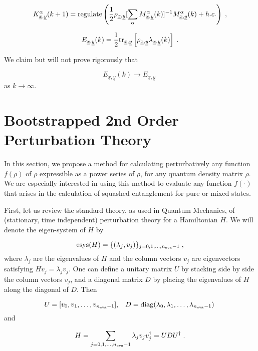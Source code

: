 \documentclass[12pt]{article}%
\newcommand{\tr}[0]{{\rm tr }}
\newcommand{\beq}{\begin{equation}}
\newcommand{\eeq}{\end{equation}}
\newcommand{\ul}[1]{\underline{#1}}
\newcommand{\rvx}[0]{{\ul{x}}}
\newcommand{\rvy}[0]{{\ul{y}}}
\newcommand{\lam}[0]{\lambda}
\newcommand{\nev}[0]{{n_{\rm eva}}}
\newcommand{\alp}[0]{{\alpha}}
\begin{document}
\beq
K^{\alp}_{\rvx,\rvy}(k+1)
=
{\rm regulate}\left(\frac{1}{2}\rho_{\rvx, \rvy}[\sum_\alp M^\alp_{\rvx, \rvy}(k)]^{-1}
M^\alp_{\rvx, \rvy}(k) + h.c.\right)
\;,
\eeq

\beq
E_{\rvx, \rvy}(k) = \frac{1}{2}\tr_{\rvx, \rvy} \left[\rho_{\rvx, \rvy}\lam_{\rvx, \rvy}(k)\right]
\;.
\eeq


We claim but will not prove rigorously that

\beq
E_{\rvx, \rvy}(k)\rightarrow
E_{\rvx, \rvy}
\;
\eeq
as $k\rightarrow \infty$.




























\section{Bootstrapped 2nd Order Perturbation Theory}

In this section, we
propose a method for calculating perturbatively
any function $f(\rho)$ of $\rho$
 expressible
as a power series of $\rho$, for any quantum density
matrix $\rho$. We are especially interested
in using this method
to evaluate any function  $f(\cdot)$
that arises in the calculation of
squashed entanglement for pure or mixed states.

First, let us review the standard theory,
as used in Quantum Mechanics, of
(stationary, time independent)
 perturbation theory for a Hamiltonian $H$.
 We will denote the eigen-system
 of $H$ by

\beq
{\rm esys}(H) = \{ (\lam_j, v_j)\}_{j=0, 1, ..., \nev-1}
\;,
\eeq
where $\lam_j$ are the
eigenvalues of $H$ and the column vectors $v_j$
are eigenvectors satisfying $Hv_j = \lam_jv_j$.
One can define a unitary matrix $U$
by stacking
side by side the column vectors $v_j$,
and a diagonal matrix $D$
by placing the eigenvalues of
$H$ along the diagonal of $D$. Then

\beq
U = [ v_0, v_1, \ldots, v_{\nev-1}],\;\;\;
D = {\rm diag}(\lam_0, \lam_1, \ldots, \lam_{\nev-1})
\;
\eeq
and

\beq
H = \sum_{j=0, 1, ..., \nev-1} \lam_j v_jv^\dag_j
= UDU^\dag
\;.
\eeq
\end{document}
